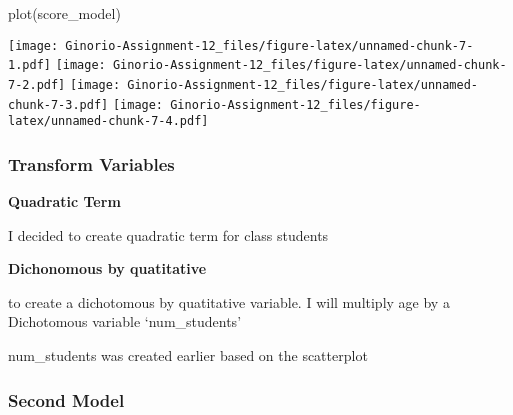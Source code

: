 \documentclass[
]{article}
\newenvironment{Shaded}{\begin{snugshade}}{\end{snugshade}}
\newcommand{\DecValTok}[1]{\textcolor[rgb]{0.00,0.00,0.81}{#1}}
\newcommand{\FunctionTok}[1]{\textcolor[rgb]{0.00,0.00,0.00}{#1}}
\newcommand{\NormalTok}[1]{#1}
\newcommand{\OtherTok}[1]{\textcolor[rgb]{0.56,0.35,0.01}{#1}}
\newcommand{\SpecialCharTok}[1]{\textcolor[rgb]{0.00,0.00,0.00}{#1}}
\begin{document}
\begin{Shaded}
\begin{Highlighting}[]
\FunctionTok{plot}\NormalTok{(score\_model)}
\end{Highlighting}
\end{Shaded}

\texttt{[image: Ginorio-Assignment-12\_files/figure-latex/unnamed-chunk-7-1.pdf]}
\texttt{[image: Ginorio-Assignment-12\_files/figure-latex/unnamed-chunk-7-2.pdf]}
\texttt{[image: Ginorio-Assignment-12\_files/figure-latex/unnamed-chunk-7-3.pdf]}
\texttt{[image: Ginorio-Assignment-12\_files/figure-latex/unnamed-chunk-7-4.pdf]}

\hypertarget{transform-variables}{%
\subsubsection{Transform Variables}\label{transform-variables}}

\textbf{Quadratic Term}

I decided to create quadratic term for class students

\begin{Shaded}
\end{Shaded}

\textbf{Dichonomous by quatitative}

to create a dichotomous by quatitative variable. I will multiply age by
a Dichotomous variable `num\_students'

num\_students was created earlier based on the scatterplot

\begin{Shaded}
\end{Shaded}

\hypertarget{second-model}{%
\subsubsection{Second Model}\label{second-model}}
\end{document}
